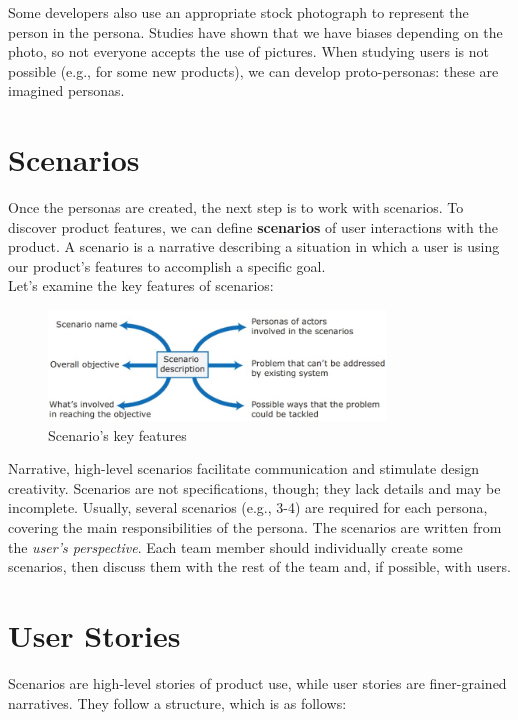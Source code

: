 Some developers also use an appropriate stock photograph to represent the person in the persona. Studies have shown that we have biases depending on the photo, so not everyone accepts the use of pictures. When studying users is not possible (e.g., for some new products), we can develop proto-personas: these are imagined personas.

\section{Scenarios}

Once the personas are created, the next step is to work with scenarios. To discover product features, we can define \textbf{scenarios} of user interactions with the product. A scenario is a narrative describing a situation in which a user is using our product’s features to accomplish a specific goal. \\

Let's examine the key features of scenarios:

\begin{figure} [H]
    \centering
    \includegraphics[width=0.8\textwidth]{images/Stories/scenariodescription.png}
    \caption{Scenario's key features}
    \label{fig:scenariodescription}
\end{figure} 

Narrative, high-level scenarios facilitate communication and stimulate design creativity. Scenarios are not specifications, though; they lack details and may be incomplete. Usually, several scenarios (e.g., 3-4) are required for each persona, covering the main responsibilities of the persona. The scenarios are written from the \emph{user’s perspective}. Each team member should individually create some scenarios, then discuss them with the rest of the team and, if possible, with users.

\section{User Stories}

Scenarios are high-level stories of product use, while user stories are finer-grained narratives. They follow a structure, which is as follows: 

